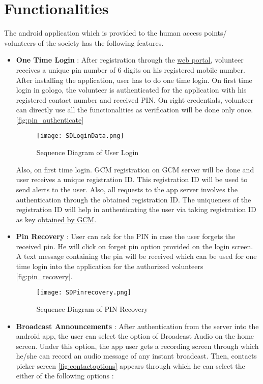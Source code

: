 \section{Functionalities}
The android application which is provided to the human access points/ volunteers of the society has the following features.
\begin{itemize}
\item \textbf{One Time Login} : After registration through the \hyperref[chap:ngoportal]{web portal}, volunteer receives a unique pin number of 6 digits on his registered mobile number. After installing the application, user has to do one time login. On first time login in gologo, the volunteer is authenticated for the application with his registered contact number and received PIN. On right credentials, volunteer can directly use all the functionalities as verification will be done only once. 
\ref{fig:pin_authenticate}


\begin{figure}[H]
    \centering
	\texttt{[image: SDLoginData.png]}
    \caption{ Sequence Diagram of User Login }
    \label{fig:Sequence Diagram of User Login}
\end{figure}

Also, on first time login. GCM registration on GCM server will be done and user receives a unique registration ID. This registration ID will be used to send alerts to the user. Also, all requests to the app server involves the authentication through the obtained registration ID. The uniqueness of the registration ID will help in authenticating the user via taking registration ID as key \hyperref[GCMlink]{obtained by GCM}. 

\item \textbf{Pin Recovery} : User can ask for the PIN in case the user forgets the received pin. He will click on forget pin option provided on the login screen. A text message containing the pin will be received which can be used for one time login into the application for the authorized volunteers \ref{fig:pin_recovery}.

\begin{figure}[H]
    \centering
	\texttt{[image: SDPinrecovery.png]}
    \caption{ Sequence Diagram of PIN Recovery}
    \label{fig:Sequence Diagram of PIN Recovery}
\end{figure}


\item \textbf{Broadcast Announcements} : After authentication from the server into the android app, the user can select the option of Broadcast Audio on the home screen. Under this option, the app user gets a recording screen through which he/she can record an audio message of any instant broadcast. Then, contacts picker screen \ref{fig:contactoptions} appears through which he can select the either of the following options :


\end{itemize}
